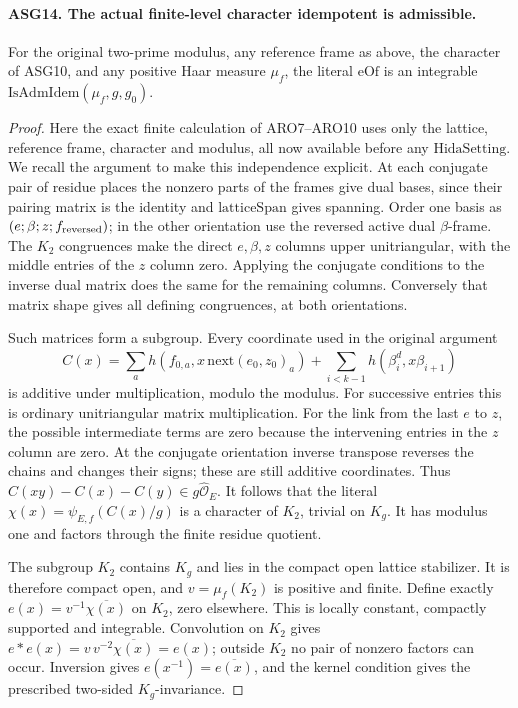 \paragraph{ASG14. The actual finite-level character idempotent is admissible.}
\label{claim:ASG14}
For the original two-prime modulus, any reference frame as above, the
character of ASG10, and any positive Haar measure \(\mu_f\), the
literal \(\mathrm{eOf}\) is an integrable
\(\mathrm{IsAdmIdem}(\mu_f,g,g_0)\).
\begin{proof}
Here the exact finite calculation of ARO7--ARO10 uses only the lattice,
reference frame, character and modulus, all now available before any
\(\mathrm{HidaSetting}\).  We recall the argument to make this
independence explicit.  At each conjugate pair of residue places the
nonzero parts of the frames give dual bases, since their pairing matrix
is the identity and \(\mathrm{latticeSpan}\) gives spanning.
Order one basis as \((e;\beta;z;f_{\rm reversed})\); in the
other orientation use the reversed active dual \(\beta\)-frame.
The \(K_2\) congruences make the direct \(e,\beta,z\) columns
upper unitriangular, with the middle entries of the \(z\) column
zero.  Applying the conjugate conditions to the inverse dual matrix
does the same for the remaining columns.  Conversely that matrix
shape gives all defining congruences, at both orientations.

Such matrices form a subgroup.  Every coordinate used in the original
argument
\[
 C(x)=\sum_a h(f_{0,a},x\,\mathrm{next}(e_0,z_0)_a)
                    +\sum_{i<k-1}h(\beta_i^d,x\beta_{i+1})
\tag{ASG.12}
\]
is additive under multiplication, modulo the modulus.  For successive
entries this is ordinary unitriangular matrix multiplication.  For the
link from the last \(e\) to \(z\), the possible intermediate
terms are zero because the intervening entries in the \(z\) column
are zero.  At the conjugate orientation inverse transpose reverses the
chains and changes their signs; these are still additive coordinates.
Thus \(C(xy)-C(x)-C(y)\in g\widehat{\mathcal O}_E\).
It follows that the literal \(\chi(x)=\psi_{E,f}(C(x)/g)\)
is a character of \(K_2\), trivial on \(K_g\).
It has modulus one and factors through the finite residue quotient.

The subgroup \(K_2\) contains \(K_g\) and lies in the compact
open lattice stabilizer.  It is therefore compact open, and
\(v=\mu_f(K_2)\) is positive and finite.  Define exactly
\(e(x)=v^{-1}\overline{\chi(x)}\) on \(K_2\), zero elsewhere.
This is locally constant, compactly supported and integrable.
Convolution on \(K_2\) gives
\(e*e(x)=v\,v^{-2}\overline{\chi(x)}=e(x)\);
outside \(K_2\) no pair of nonzero factors can occur.
Inversion gives \(e(x^{-1})=\overline{e(x)}\), and the kernel
condition gives the prescribed two-sided \(K_g\)-invariance.


\end{proof}
